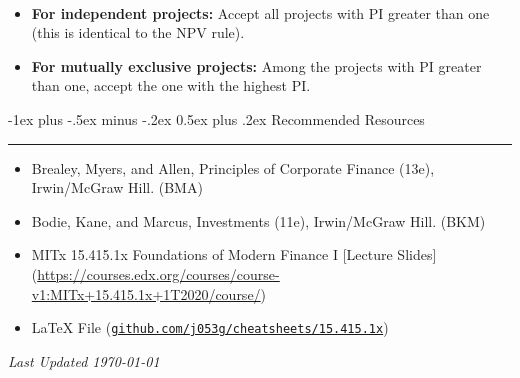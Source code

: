 \documentclass[10pt,landscape,a4paper]{article}
\makeatletter
\renewcommand{\section}{\@startsection{section}{1}{0mm}%
                                {-1ex plus -.5ex minus -.2ex}%
                                {0.5ex plus .2ex}%
                                {\normalfont\large\bfseries}}
\makeatother
\begin{document}
\begin{multicols*}{3}
\begin{description}[itemsep=0pt]
	\item[Decision Criterion Using PI]  ~
	\begin{itemize}
		\item {\bf For independent projects:} Accept all projects with PI greater than one (this
		is identical to the NPV rule).
		\item {\bf For mutually exclusive projects: } Among the projects with PI greater than
		one, accept the one with the highest PI.
		
	\end{itemize}
\end{description}


\section{Recommended Resources} \smallskip \hrule height 1pt \smallskip

\bigskip

\begin{itemize}
\item Brealey, Myers, and Allen, Principles of Corporate Finance (13e), Irwin/McGraw Hill. (BMA)
\item Bodie, Kane, and Marcus, Investments (11e), Irwin/McGraw Hill. (BKM)
\item MITx 15.415.1x Foundations of Modern Finance I [Lecture Slides] (\url{https://courses.edx.org/courses/course-v1:MITx+15.415.1x+1T2020/course/})
\item LaTeX File (\texttt{\href{https://github.com/j053g/cheatsheets/15.415.1x/15.415.1x_finance_1.tex}{github.com/j053g/cheatsheets/15.415.1x}})
\end{itemize}

\begin{center}
	\emph{Last Updated \today}
\end{center}

\end{multicols*}
\end{document}
